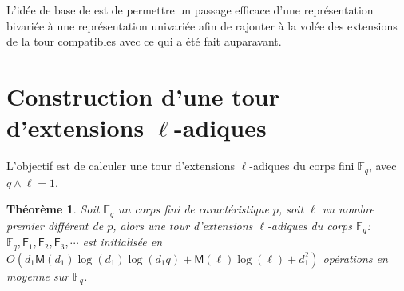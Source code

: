 \documentclass[10pt,a4paper]{book}
\theoremstyle{plain}
\newtheorem{thm}{Théorème}[chapter]
\theoremstyle{definition}
\theoremstyle{definition}
\theoremstyle{definition}
\theoremstyle{definition}
\theoremstyle{definition}
\theoremstyle{remark}
\theoremstyle{remark}
\theoremstyle{definition}
\begin{document}
L'idée de base de \cite{Doliskani-Schost15} est de permettre un passage efficace d'une représentation bivariée à une représentation univariée afin de rajouter à la volée des extensions de la tour compatibles avec ce qui a été fait auparavant.

\section{Construction d'une tour d'extensions $\ell$-adiques}
L'objectif est de calculer une tour d'extensions $\ell$-adiques du corps fini $\mathbb{F}_q$, avec $q \wedge \ell =1$. 

\begin{thm}
\label{thm:init:tow}
Soit $\mathbb{F}_q$ un corps fini de caractéristique $p$, soit $\ell$ un nombre premier différent de $p$,  alors une tour d'extensions $\ell$-adiques du corps $\mathbb{F}_q$: $\mathbb{F}_q, \mathsf{F}_1, \mathsf{F}_2, \mathsf{F}_3, \cdots$ est initialisée en $O(d_1\mathsf{M}(d_1)\log(d_1)\log(d_1q)+\mathsf{M}(\ell)\log(\ell)+d_1^2)$ opérations en moyenne sur $\mathbb{F}_q$.
\end{thm}
 
\end{document}

